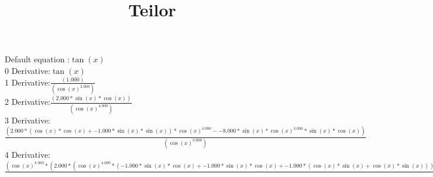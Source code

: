 \documentclass[a4paper, 12pt]{article}
\title{Teilor}
\begin{document}
\maketitle 
Default equation :$\tan{(x)}$\\0 Derivative:$\tan{(x)}$\\ 
1 Derivative:$\frac{({1.000})}{(\cos{(x)}^{2.000})}$\\ 
2 Derivative:$\frac{({2.000}*\sin{(x)}*\cos{(x)})}{(\cos{(x)}^{4.000})}$\\ 
3 Derivative:$\frac{({2.000}*{(\cos{(x)}*\cos{(x)}+{-1.000}*\sin{(x)}*\sin{(x)})}*\cos{(x)}^{4.000}-{-8.000}*\sin{(x)}*\cos{(x)}^{3.000}*\sin{(x)}*\cos{(x)})}{(\cos{(x)}^{8.000})}$\\ 
4 Derivative:$\frac{(\cos{(x)}^{8.000}*{({2.000}*{(\cos{(x)}^{4.000}*{({-1.000}*\sin{(x)}*\cos{(x)}+{-1.000}*\sin{(x)}*\cos{(x)}+{-1.000}*{(\cos{(x)}*\sin{(x)}+\cos{(x)}*\sin{(x)})})}+{-4.000}*\sin{(x)}*\cos{(x)}^{3.000}*{(\cos{(x)}*\cos{(x)}+{-1.000}*\sin{(x)}*\sin{(x)})})}-{-8.000}*{(\sin{(x)}*\cos{(x)}*{(\cos{(x)}*\cos{(x)}^{3.000}+{-3.000}*\sin{(x)}*\cos{(x)}^{2.000}*\sin{(x)})}+\sin{(x)}*\cos{(x)}^{3.000}*{(\cos{(x)}*\cos{(x)}+{-1.000}*\sin{(x)}*\sin{(x)})})})}-{-8.000}*\sin{(x)}*\cos{(x)}^{7.000}*{({2.000}*{(\cos{(x)}*\cos{(x)}+{-1.000}*\sin{(x)}*\sin{(x)})}*\cos{(x)}^{4.000}-{-8.000}*\sin{(x)}*\cos{(x)}^{3.000}*\sin{(x)}*\cos{(x)})})}{(\cos{(x)}^{16.000})}$\\ 
\end{document}
